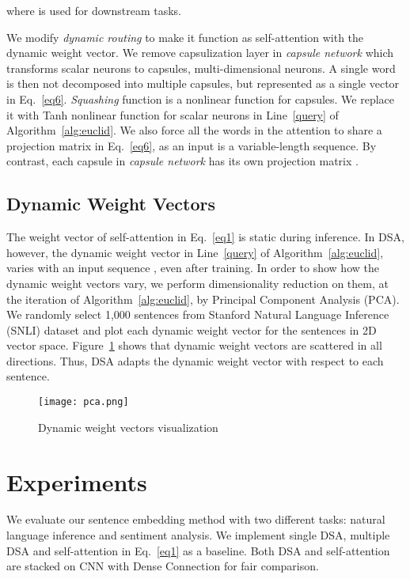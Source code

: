 \documentclass[11pt,a4paper]{article}
\begin{document}
where  is used for downstream tasks.


We modify \textit{dynamic routing} \cite{capsule} to make it function as self-attention with the dynamic weight vector. We remove capsulization layer in \textit{capsule network} which transforms scalar neurons to capsules, multi-dimensional neurons. A single word is then not decomposed into multiple capsules, but represented as a single vector  in Eq.~\ref{eq6}. \textit{Squashing} function is a nonlinear function for capsules. We replace it with Tanh nonlinear function for scalar neurons in Line~\ref{query} of Algorithm~\ref{alg:euclid}. We also force all the words in the  attention to share a projection matrix  in Eq.~\ref{eq6}, as an input is a variable-length sequence. By contrast, each capsule in \textit{capsule network} has its own projection matrix .

\subsection{Dynamic Weight Vectors}\label{model3}

The weight vector  of self-attention in Eq.~\ref{eq1} is static during inference. In DSA, however, the dynamic weight vector  in Line~\ref{query} of Algorithm~\ref{alg:euclid}, varies with an input sequence , even after training. In order to show how the dynamic weight vectors vary, we perform dimensionality reduction on them,  at the  iteration of Algorithm~\ref{alg:euclid}, by Principal Component Analysis (PCA). We randomly select 1,000 sentences from Stanford Natural Language Inference (SNLI) dataset and plot each dynamic weight vector for the sentences in 2D vector space. Figure~\ref{fig:pca} shows that dynamic weight vectors are scattered in all directions. Thus, DSA adapts the dynamic weight vector with respect to each sentence. \begin{figure}
        \centering    
        \texttt{[image: pca.png]}
        \caption{Dynamic weight vectors visualization}\label{fig:pca}
\end{figure}









\section {Experiments}\label{experiments}

We evaluate our sentence embedding method with two different tasks: natural language inference and sentiment analysis. We implement single DSA, multiple DSA and self-attention in Eq.~\ref{eq1} as a baseline. Both DSA and self-attention are stacked on CNN with Dense Connection for fair comparison.
\end{document}
